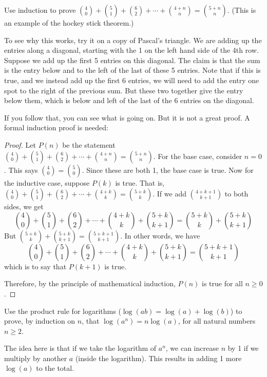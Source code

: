 \begin{questions}
\question Use induction to prove ${4 \choose 0} + {5 \choose 1} + {6 \choose 2} + \cdots + {4+n \choose n} = {5+n \choose n}$.  (This is an example of the hockey stick theorem.)

	\begin{answer}
		To see why this works, try it on a copy of Pascal's triangle.  We are adding up the entries along a diagonal, starting with the 1 on the left hand side of the 4th row.  Suppose we add up the first 5 entries on this diagonal.  The claim is that the sum is the entry below and to the left of the last of these 5 entries.  Note that if this is true, and we instead add up the first 6 entries, we will need to add the entry one spot to the right of the previous sum.  But these two together give the entry below them, which is below and left of the last of the 6 entries on the diagonal.
		
		If you follow that, you can see what is going on.  But it is not a great proof.  A formal induction proof is needed:
		
		\begin{proof}
			Let $P(n)$ be the statement ${4 \choose 0} + {5 \choose 1} + {6 \choose 2} + \cdots + {4+n \choose n} = {5+n \choose n}$.  For the base case, consider $n = 0$.  This says ${4 \choose 0} = {5 \choose 0}$.  Since these are both 1, the base case is true.  Now for the inductive case, suppose $P(k)$ is true.  That is, ${4 \choose 0} + {5 \choose 1} + {6 \choose 2} + \cdots + {4+k \choose k} = {5+k \choose k}$.  If we add ${4+k+1 \choose k+1}$ to both sides, we get \[{4 \choose 0} + {5 \choose 1} + {6 \choose 2} + \cdots + {4+k \choose k} + {5+k \choose k+1}= {5+k \choose k} + {5+k \choose k+1}\]
			But ${5+k \choose k} + {5+k \choose k+1} = {5+k+1 \choose k+1}$.  In other words, we have
			\[{4 \choose 0} + {5 \choose 1} + {6 \choose 2} + \cdots + {4+k \choose k} + {5+k \choose k+1} = {5+k+1 \choose k+1}\]
			which is to say that $P(k+1)$ is true.
			
			Therefore, by the principle of mathematical induction, $P(n)$ is true for all $n \ge 0$.
		\end{proof}
	\end{answer}
	
	
\question Use the product rule for logarithms ($\log(ab) = \log(a) + \log(b)$) to prove, by induction on $n$, that $\log(a^n) = n \log(a)$, for all natural numbers $n \ge 2$.

	\begin{answer}
		The idea here is that if we take the logarithm of $a^n$, we can increase $n$ by 1 if we multiply by another $a$ (inside the logarithm).  This results in adding 1 more $\log(a)$ to the total.
		

\end{answer}
\end{questions}
